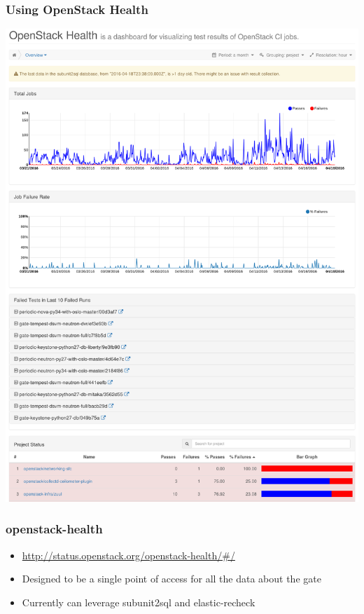 \documentclass[aspectratio=169,11pt,hyperref={colorlinks=true}]{beamer}
\begin{document}
\begin{frame}
    \frametitle{Using OpenStack Health}
    \begin{center}
        \includegraphics[height=.9\textheight]{HomePage.png}
    \end{center}
\end{frame}

\begin{frame}
    \frametitle{openstack-health}
    \begin{itemize}
        \item \href{http://status.openstack.org/openstack-health/\#/}{http://status.openstack.org/openstack-health/\#/}
        \item Designed to be a single point of access for all the data about the gate
        \item Currently can leverage subunit2sql and elastic-recheck
    \end{itemize}
\end{frame}
\end{document}
